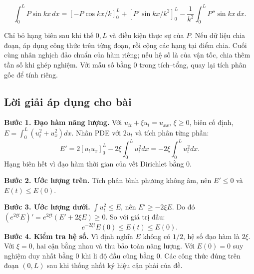 \documentclass[10pt,a4paper]{article}
\begin{document}
\[
\int_0^L P\sin kx\,dx
=\left[-P\cos kx/k\right]_0^L+
\left[P'\sin kx/k^2\right]_0^L-
\frac1{k^2}\int_0^L P''\sin kx\,dx.
\]


Chỉ bỏ hạng biên sau khi thế $0,L$ và điều kiện thực sự của $P$. Nếu dữ liệu chia đoạn, áp dụng công thức trên từng đoạn, rồi cộng các hạng tại điểm chia. Cuối cùng nhân nghịch đảo chuẩn của hàm riêng; nếu hệ số là của vận tốc, chia thêm tần số khi ghép nghiệm. Với mẫu số bằng $0$ trong tích–tổng, quay lại tích phân gốc để tính riêng.
\subsection*{Lời giải áp dụng cho bài}
\textbf{Bước 1. Đạo hàm năng lượng.} Với $u_{tt}+\xi u_t=u_{xx}$, $\xi\ge0$, biên cố định, $E=\int_0^L(u_t^2+u_x^2)dx$. Nhân PDE với $2u_t$ và tích phân từng phần:
\[E'=2[u_tu_x]_0^L-2\xi\int_0^Lu_t^2dx=-2\xi\int_0^Lu_t^2dx.\]
Hạng biên hết vì đạo hàm thời gian của vết Dirichlet bằng $0$.

\textbf{Bước 2. Ước lượng trên.} Tích phân bình phương không âm, nên $E'\le0$ và $E(t)\le E(0)$.

\textbf{Bước 3. Ước lượng dưới.} $\int u_t^2\le E$, nên $E'\ge-2\xi E$. Do đó $(e^{2\xi t}E)'=e^{2\xi t}(E'+2\xi E)\ge0$. So với giá trị đầu:
\[e^{-2\xi t}E(0)\le E(t)\le E(0).\]
\textbf{Bước 4. Kiểm tra hệ số.} Vì định nghĩa $E$ không có $1/2$, hệ số đạo hàm là $2\xi$. Với $\xi=0$, hai cận bằng nhau và thu bảo toàn năng lượng. Với $E(0)=0$ suy nghiệm duy nhất bằng $0$ khi li độ đầu cũng bằng $0$. Các công thức đúng trên đoạn $(0,L)$ sau khi thống nhất ký hiệu cận phải của đề.
\end{document}
